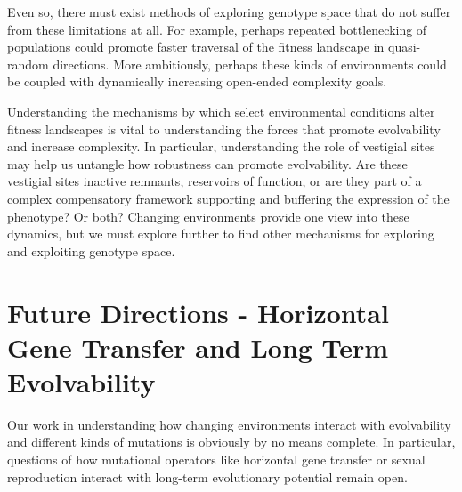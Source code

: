 \documentclass[PhD]{msu-thesis}
\begin{document}
Even so, there must exist methods of exploring genotype space that do not suffer from these limitations at all.
For example, perhaps repeated bottlenecking of populations could promote faster traversal of the fitness landscape in quasi-random directions. More ambitiously, perhaps these kinds of environments could be coupled with dynamically increasing open-ended complexity goals.

Understanding the mechanisms by which select environmental conditions alter fitness landscapes is vital to understanding the forces that promote evolvability and increase complexity. In particular, understanding the role of vestigial sites may help us untangle how robustness can promote evolvability. Are these vestigial sites inactive remnants, reservoirs of function, or are they part of a complex compensatory framework supporting and buffering the expression of the phenotype? Or both? Changing environments provide one view into these dynamics, but we must explore further to find other mechanisms for exploring and exploiting genotype space.

\section{Future Directions - Horizontal Gene Transfer and Long Term Evolvability}
Our work in understanding how changing environments interact with evolvability and different kinds of mutations is obviously by no means complete. In particular, questions of how mutational operators like horizontal gene transfer or sexual reproduction interact with long-term evolutionary potential remain open.

\end{document}
